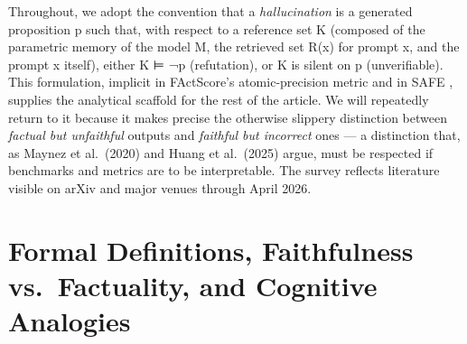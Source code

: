 \documentclass{article}
\begin{document}
Throughout, we adopt the convention that a \emph{hallucination} is a generated proposition p such that, with respect to a reference set K (composed of the parametric memory of the model M, the retrieved set R(x) for prompt x, and the prompt x itself), either K ⊨ ¬p (refutation), or K is silent on p (unverifiable). This formulation, implicit in FActScore's atomic-precision metric and in SAFE \citep{wei2024longformfactuality}, supplies the analytical scaffold for the rest of the article. We will repeatedly return to it because it makes precise the otherwise slippery distinction between \emph{factual but unfaithful} outputs and \emph{faithful but incorrect} ones --- a distinction that, as Maynez et al.~(2020) and Huang et al.~(2025) argue, must be respected if benchmarks and metrics are to be interpretable. The survey reflects literature visible on arXiv and major venues through April 2026.

\section{Formal Definitions, Faithfulness vs.~Factuality, and Cognitive Analogies}\label{formal-definitions-faithfulness-vs.-factuality-and-cognitive-analogies}
\end{document}
